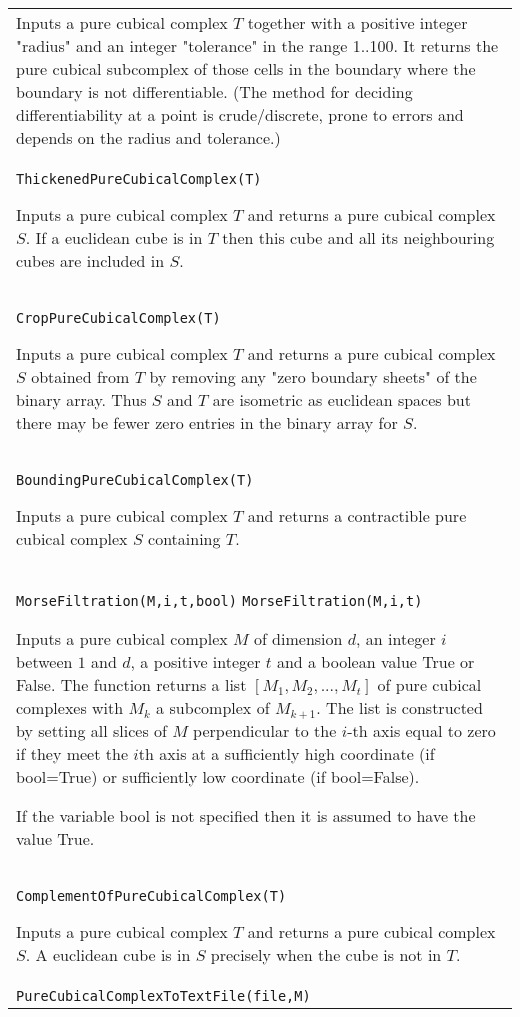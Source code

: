 \documentclass[a4paper,11pt]{report}
\begin{document}
{\begin{center}
\begin{tabular}{|l|}
 Inputs a pure cubical complex $T$ together with a positive integer "radius" and an integer "tolerance" in the
range 1..100. It returns the pure cubical subcomplex of those cells in the
boundary where the boundary is not differentiable. (The method for deciding
differentiability at a point is crude/discrete, prone to errors and depends on
the radius and tolerance.) \\
 \index{ThickenedPureCubicalComplex} \texttt{ThickenedPureCubicalComplex(T)} 

 Inputs a pure cubical complex $T$ and returns a pure cubical complex $S$. If a euclidean cube is in $T$ then this cube and all its neighbouring cubes are included in $S$. \\
 \index{CropPureCubicalComplex} \texttt{CropPureCubicalComplex(T)} 

 Inputs a pure cubical complex $T$ and returns a pure cubical complex $S$ obtained from $T$ by removing any "zero boundary sheets" of the binary array. Thus $S$ and $T$ are isometric as euclidean spaces but there may be fewer zero entries in the
binary array for $S$. \\
 \index{BoundingPureCubicalComplex} \texttt{BoundingPureCubicalComplex(T)} 

 Inputs a pure cubical complex $T$ and returns a contractible pure cubical complex $S$ containing $T$. \\
 \index{MorseFiltration} \texttt{MorseFiltration(M,i,t,bool)} \texttt{MorseFiltration(M,i,t)} 

 Inputs a pure cubical complex $M$ of dimension $d$, an integer $i$ between $1$ and $d$, a positive integer $t$ and a boolean value True or False. The function returns a list $[M_1, M_2, ..., M_t]$ of pure cubical complexes with $M_k$ a subcomplex of $M_{k+1}$. The list is constructed by setting all slices of $M$ perpendicular to the $i$-th axis equal to zero if they meet the $i$th axis at a sufficiently high coordinate (if bool=True) or sufficiently low
coordinate (if bool=False). 

 If the variable bool is not specified then it is assumed to have the value
True. \\
 \index{ComplementOfPureCubicalComplex} \texttt{ComplementOfPureCubicalComplex(T)} 

 Inputs a pure cubical complex $T$ and returns a pure cubical complex $S$. A euclidean cube is in $S$ precisely when the cube is not in $T$. \\
 \index{PureCubicalComplexToTextFile} \texttt{PureCubicalComplexToTextFile(file,M)} 


\end{tabular}
\end{center}}
\end{document}
